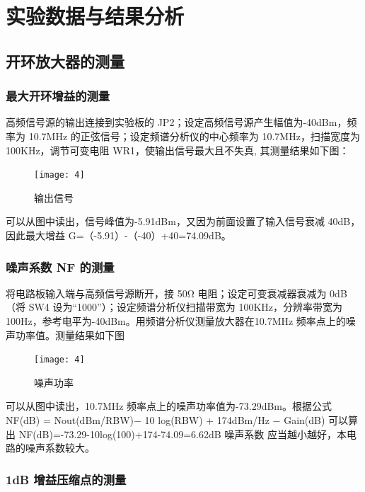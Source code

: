 \documentclass{../source/Experiment}
\begin{document}
    \section{实验数据与结果分析}
        \subsection{开环放大器的测量}
            \subsubsection{最大开环增益的测量}
            
            高频信号源的输出连接到实验板的 JP2；设定高频信号源产生幅值为-40dBm，频率为 10.7MHz 的正弦信号；设定频谱分析仪的中心频率为 10.7MHz，扫描宽度为 100KHz，调节可变电阻 WR1，使输出信号最大且不失真, 其测量结果如下图：

            \begin{figure}[H]
                \centering
                \texttt{[image: 4]}
                \caption{输出信号}
            \end{figure}

            可以从图中读出，信号峰值为-5.91dBm，又因为前面设置了输入信号衰减 40dB，因此最大增益 G=（-5.91）-（-40）+40=74.09dB。


            
            \subsubsection{噪声系数 NF 的测量}

            将电路板输入端与高频信号源断开，接 50Ω 电阻；设定可变衰减器衰减为 0dB（将 SW4 设为“1000”）；设定频谱分析仪扫描带宽为 100KHz，分辨率带宽为 100Hz，参考电平为-40dBm。用频谱分析仪测量放大器在10.7MHz 频率点上的噪声功率值。测量结果如下图

            \begin{figure}[H]
                \centering
                \texttt{[image: 4]}
                \caption{噪声功率}
            \end{figure}

            
            可以从图中读出，10.7MHz 频率点上的噪声功率值为-73.29dBm。根据公式 NF(dB) = Nout(dBm/RBW)−
            10 log(RBW) + 174dBm/Hz − Gain(dB) 可以算出 NF(dB)=-73.29-10log(100)+174-74.09=6.62dB 噪声系数
            应当越小越好，本电路的噪声系数较大。
            
            
            \subsubsection{1dB 增益压缩点的测量}
\end{document}
